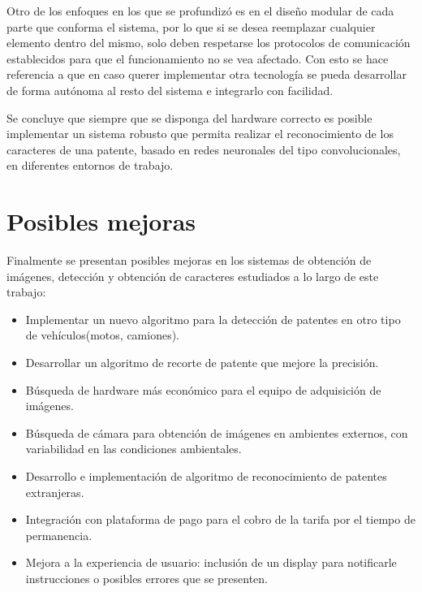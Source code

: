 Otro de los enfoques en los que se profundizó es en el diseño modular de cada parte que conforma el sistema, por lo que si se desea reemplazar cualquier elemento dentro del mismo, solo deben respetarse los protocolos de comunicación establecidos para que el funcionamiento no se vea afectado.
Con esto se hace referencia a que en caso querer implementar otra tecnología se pueda desarrollar de forma autónoma al resto del sistema e integrarlo con facilidad.

Se concluye que siempre que se disponga del hardware correcto es posible implementar un sistema robusto que permita realizar el reconocimiento de los caracteres de una patente, basado en redes neuronales del tipo convolucionales, en diferentes entornos de trabajo.


\section{Posibles mejoras}
Finalmente se presentan posibles mejoras en los sistemas de obtención de imágenes, detección y obtención de caracteres estudiados a lo largo de este trabajo:
\begin{itemize}
    \item Implementar un nuevo algoritmo para la detección de patentes en otro tipo de vehículos(motos, camiones).
    \item Desarrollar un algoritmo de recorte de patente que mejore la precisión.
    \item Búsqueda de hardware más económico para el equipo de adquisición de imágenes.
    \item Búsqueda de cámara para obtención de imágenes en ambientes externos, con variabilidad en las condiciones ambientales.
    \item Desarrollo e implementación de algoritmo de reconocimiento de patentes extranjeras.
    \item Integración con plataforma de pago para el cobro de la tarifa por el tiempo de permanencia.  
    \item Mejora a la experiencia de usuario: inclusión de un display para notificarle instrucciones o posibles errores que se presenten.
\end{itemize}
